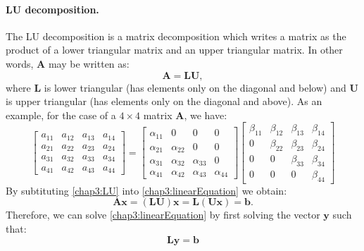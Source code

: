 \paragraph*{LU decomposition.}
The LU decomposition is a matrix decomposition which writes a matrix as the product of a lower triangular matrix and an upper triangular matrix. In other words, $ \mathbf{A} $ may be written as:
\begin{equation}
\label{chap3:LU}
\mathbf{A} = \mathbf{L} \mathbf{U},
\end{equation}
where $ \mathbf{L} $ is lower triangular (has elements only on the diagonal and below) and $ \mathbf{U} $ is upper triangular (has elements only on the diagonal and above). As an example, for the case of a $ 4 \times 4 $ matrix $ \mathbf{A} $, we have:
\begin{equation}
	\begin{bmatrix}
	a_{11} & a_{12} & a_{13} & a_{14} \\
	a_{21} & a_{22} & a_{23} & a_{24} \\
	a_{31} & a_{32} & a_{33} & a_{34} \\
	a_{41} & a_{42} & a_{43} & a_{44}
	\end{bmatrix}
=
	\begin{bmatrix}
	\alpha_{11} & 0 & 0 & 0 \\
	\alpha_{21} & \alpha_{22} & 0 & 0 \\
	\alpha_{31} & \alpha_{32} & \alpha_{33} & 0 \\
	\alpha_{41} & \alpha_{42} & \alpha_{43} & \alpha_{44}
	\end{bmatrix}
	\begin{bmatrix}
	\beta_{11} & \beta_{12} & \beta_{13} & \beta_{14} \\
	0 & \beta_{22} & \beta_{23} & \beta_{24} \\
	0 & 0 & \beta_{33} & \beta_{34} \\
	0 & 0 & 0 & \beta_{44}
	\end{bmatrix}
\end{equation}
By subtituting \eqref{chap3:LU} into \eqref{chap3:linearEquation} we obtain:
\begin{equation}
\mathbf{A} \mathbf{x} = (\mathbf{L} \mathbf{U}) \mathbf{x} = \mathbf{L} (\mathbf{U} \mathbf{x}) = \mathbf{b}.
\end{equation}
Therefore, we can solve \eqref{chap3:linearEquation} by first solving the vector $ \mathbf{y} $ such that:
\begin{equation}
\label{chap3:eqLyb}
\mathbf{L} \mathbf{y} = \mathbf{b}
\end{equation}
